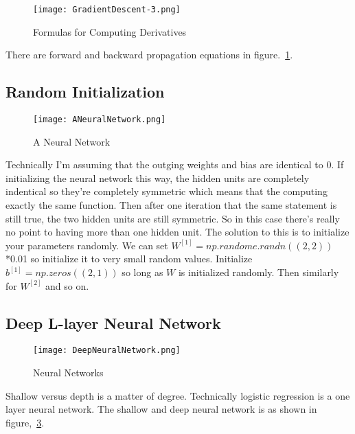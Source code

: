 \documentclass[a4paper]{article}
\begin{document}
\begin{figure}[!htp]
\begin{center}
   \texttt{[image: GradientDescent-3.png]}
\end{center}
   \caption{Formulas for Computing Derivatives~\cite{mooc.com,Coursera.org}}
\label{fig:GD-3}
\end{figure}

There are forward and backward propagation equations in figure.~\ref{fig:GD-3}.


\subsection{Random Initialization}

\begin{figure}[!htp]
\begin{center}
   \texttt{[image: ANeuralNetwork.png]}
\end{center}
   \caption{A Neural Network~\cite{mooc.com,Coursera.org}}
\label{fig:ANN}
\end{figure}

Technically I'm assuming that the outging weights and bias are identical to 0. If initializing the neural network this way, the hidden units are completely indentical so they're completely symmetric which means that the computing exactly the same function. Then after one iteration that the same statement is still true, the two hidden units are still symmetric. So in this case there's really no point to having more than one hidden unit. The solution to this is to initialize your parameters randomly. We can set $W^{[1]}=np.randome.randn((2,2))$*0.01 so initialize it to very small random values. Initialize $b^{[1]}=np.zeros((2,1))$ so long as $W$ is initialized randomly. Then similarly for $W^{[2]}$ and so on.


\subsection{Deep L-layer Neural Network}

\begin{figure}[!htp]
\begin{center}
   \texttt{[image: DeepNeuralNetwork.png]}
\end{center}
   \caption{Neural Networks~\cite{mooc.com,Coursera.org}}
\label{fig:NNS}
\end{figure}

Shallow versus depth is a matter of degree. Technically logistic regression is a one layer neural network. The shallow and deep neural network is as shown in figure,~\ref{fig:NNS}.
\end{document}
